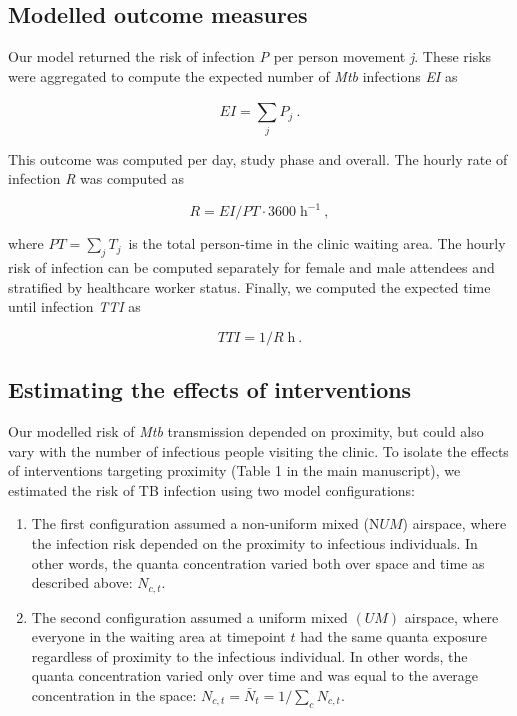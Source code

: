 \documentclass[11pt]{article}
\begin{document}
\subsection{Modelled outcome measures}\label{modelled-outcome-measures}

Our model returned the risk of infection \emph{P} per person movement \emph{j}. These risks were aggregated to compute the expected number of \emph{Mtb} infections \emph{EI} as

\[EI = \sum_{j}^{}P_{j}~.\]

This outcome was computed per day, study phase and overall. The hourly rate of infection \emph{R} was computed as

\[R = EI/PT \cdot 3600 \; \text{h}^{-1}~,\]

where \(PT = \sum_{j}^{}{}T_{j\ }\) is the total person-time in the clinic waiting area. The hourly risk of infection can be computed separately for female and male attendees and stratified by healthcare worker status. Finally, we computed the expected time until infection \emph{TTI} as

\[TTI = 1/R \; \text{h}~.\]

\subsection{Estimating the effects of interventions}\label{estimating-the-effects-of-interventions}

Our modelled risk of \emph{Mtb} transmission depended on proximity, but could also vary with the number of infectious people visiting the clinic. To isolate the effects of interventions targeting proximity (Table 1 in the main manuscript), we estimated the risk of TB infection using two model configurations:

\begin{enumerate}
\def\labelenumi{\arabic{enumi}.}
\item
  The first configuration assumed a non-uniform mixed (N\(UM\)) airspace, where the infection risk depended on the proximity to infectious individuals. In other words, the quanta concentration varied both over space and time as described above: \(N_{c,t}\).
\item
  The second configuration assumed a uniform mixed \((UM)\) airspace, where everyone in the waiting area at timepoint \(t\) had the same quanta exposure regardless of proximity to the infectious individual. In other words, the quanta concentration varied only over time and was equal to the average concentration in the space: \(N_{c,t} = {\bar{N}}_{t} = 1/\sum_{c}^{}{}N_{c,t}\).
\end{enumerate}
\end{document}
